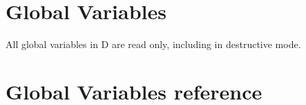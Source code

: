 \section{Global Variables}

All global variables in D are read only, including in destructive mode.

\section{Global Variables reference}





























